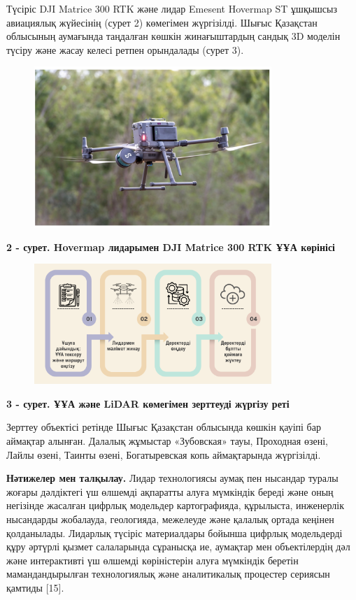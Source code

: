 Түсіріс DJI Matrice 300 RTK және лидар Emesent Hovermap ST ұшқышсыз
авиациялық жүйесінің (сурет 2) көмегімен жүргізілді. Шығыс Қазақстан
облысының аумағында таңдалған көшкін жинағыштардың сандық 3D моделін
түсіру және жасау келесі ретпен орындалады (сурет 3).


\begin{figure}[H]
	\centering
	\includegraphics[width=0.8\textwidth]{media/ict2/image200}
	\caption*{}
\end{figure}


{\bfseries 2 - сурет. Hovermap лидарымен DJI Matrice 300 RTK ҰҰА көрінісі}


\begin{figure}[H]
	\centering
	\includegraphics[width=0.8\textwidth]{media/ict2/image201}
	\caption*{}
\end{figure}


{\bfseries 3 - сурет. ҰҰА және LiDAR көмегімен зерттеуді жүргізу реті}

Зерттеу объектісі ретінде Шығыс Қазақстан облысында көшкін қауіпі бар
аймақтар алынған. Далалық жұмыстар «Зубовская» тауы, Проходная өзені,
Лайлы өзені, Таинты өзені, Богатыревская копь аймақтарында жүргізілді.

{\bfseries Нәтижелер мен талқылау.} Лидар технологиясы аумақ пен нысандар
туралы жоғары дәлдіктегі үш өлшемді ақпаратты алуға мүмкіндік береді
және оның негізінде жасалған цифрлық модельдер картографияда, құрылыста,
инженерлік нысандарды жобалауда, геологияда, межелеуде және қалалық
ортада кеңінен қолданылады. Лидарлық түсіріс материалдары бойынша
цифрлық модельдерді құру әртүрлі қызмет салаларында сұранысқа ие,
аумақтар мен объектілердің дәл және интерактивті үш өлшемді көріністерін
алуға мүмкіндік беретін мамандандырылған технологиялық және аналитикалық
процестер сериясын қамтиды {[}15{]}.

